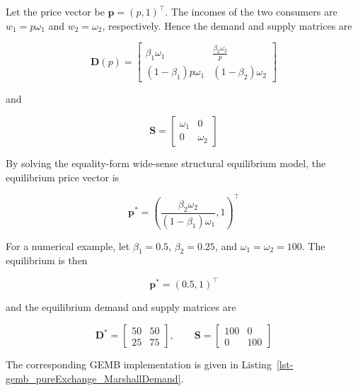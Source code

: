 \documentclass[
  letterpaper,
  DIV=11,
  numbers=noendperiod]{scrreprt}
\begin{document}
Let the price vector be \(\mathbf p=(p,1)^\top\). The incomes of the two
consumers are \(w_1=p\omega_1\) and \(w_2=\omega_2\), respectively.
Hence the demand and supply matrices are

\[
\mathbf D(p)
=
\begin{bmatrix}
\beta_1\omega_1&
\frac{\beta_2\omega_2}{p}\\
(1-\beta_1)p\omega_1&
(1-\beta_2)\omega_2
\end{bmatrix}
\]

and

\[
\mathbf S
=
\begin{bmatrix}
\omega_1&0\\
0&\omega_2
\end{bmatrix}
\]

By solving the equality-form wide-sense structural equilibrium model,
the equilibrium price vector is

\[
\mathbf p^*
=
\left(
\frac{\beta_2\omega_2}
{(1-\beta_1)\omega_1},
1
\right)^\top
\]

For a numerical example, let \(\beta_1=0.5\), \(\beta_2=0.25\), and
\(\omega_1=\omega_2=100\). The equilibrium is then

\[
\mathbf p^*=(0.5,1)^\top
\]

and the equilibrium demand and supply matrices are

\[
\mathbf D^*
=
\begin{bmatrix}
50&50\\
25&75
\end{bmatrix},
\qquad
\mathbf S
=
\begin{bmatrix}
100&0\\
0&100
\end{bmatrix}
\]

The corresponding GEMB implementation is given in
Listing~\ref{lst-gemb_pureExchange_MarshallDemand}.
\end{document}
